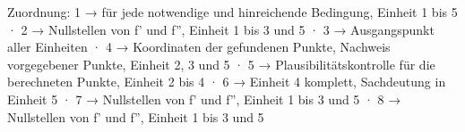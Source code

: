 
Zuordnung: 1 → für jede notwendige und hinreichende Bedingung, Einheit 1 bis 5 · 2 → Nullstellen von f' und f'', Einheit 1 bis 3 und 5 · 3 → Ausgangspunkt aller Einheiten · 4 → Koordinaten der gefundenen Punkte, Nachweis vorgegebener Punkte, Einheit 2, 3 und 5 · 5 → Plausibilitätskontrolle für die berechneten Punkte, Einheit 2 bis 4 · 6 → Einheit 4 komplett, Sachdeutung in Einheit 5 · 7 → Nullstellen von f' und f'', Einheit 1 bis 3 und 5 · 8 → Nullstellen von f' und f'', Einheit 1 bis 3 und 5

